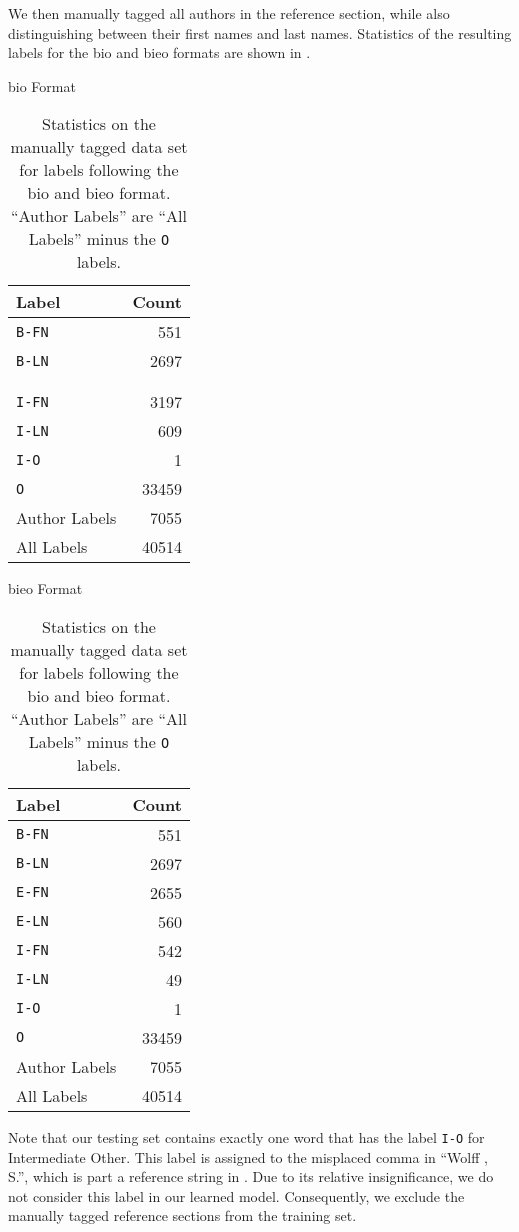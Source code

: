 We then manually tagged all authors in the reference section, while also distinguishing between their first names and last names.
Statistics of the resulting labels for the \gls{bio} and \gls{bieo} formats are shown in .
\begin{table}
\centering
\begin{minipage}[t]{0.3\linewidth}
\centering
\gls{bio} Format\par
\smallskip
\begin{tabular}{l r}
  \toprule
  Label & Count\\
  \midrule
  \texttt{B-FN}    & \num{551}\\
  \texttt{B-LN}    & \num{2697}\\
                   & \\
                   & \\
  \texttt{I-FN}    & \num{3197}\\
  \texttt{I-LN}    & \num{609}\\
  \texttt{I-O}     & \num{1}\\
  \texttt{O}       & \num{33459}\\
  \midrule
  Author Labels    & \num{7055}\\
  All Labels       & \num{40514}\\
  \bottomrule
\end{tabular}
\end{minipage}
\quad
\begin{minipage}[t]{0.3\linewidth}
\centering
\gls{bieo} Format\par
\smallskip
\begin{tabular}{l r}
  \toprule
  Label & Count\\
  \midrule
  \texttt{B-FN}    & \num{551}\\
  \texttt{B-LN}    & \num{2697}\\
  \texttt{E-FN}    & \num{2655}\\
  \texttt{E-LN}    & \num{560}\\
  \texttt{I-FN}    & \num{542}\\
  \texttt{I-LN}    & \num{49}\\
  \texttt{I-O}     & \num{1}\\
  \texttt{O}       & \num{33459}\\
  \midrule
  Author Labels    & \num{7055}\\
  All Labels       & \num{40514}\\
  \bottomrule
\end{tabular}
\end{minipage}
\caption{Statistics on the manually tagged data set for labels following the \gls{bio} and \gls{bieo} format. ``Author Labels'' are ``All Labels'' minus the \texttt{O} labels.}
\label{tab:statistics-manually-tagged}
\end{table}
Note that our testing set contains exactly one word that has the label \texttt{I-O} for Intermediate Other.
This label is assigned to the misplaced comma in ``Wolff , S.'', which is part a reference string in \citet{morth1998spurensuche}.
Due to its relative insignificance, we do not consider this label in our learned model.
Consequently, we exclude the manually tagged reference sections from the training set.

